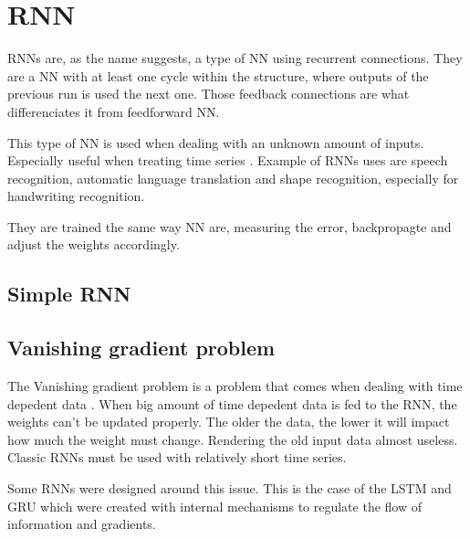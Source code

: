 \section{\acs{RNN}}\label{sec:rnn}

\acp{RNN} are, as the name suggests, a type of \ac{NN} using recurrent connections. They are a \ac{NN} with at least one cycle within the structure, where outputs of the previous run is used the next one. Those feedback connections are what differenciates it from feedforward \ac{NN}.

This type of \ac{NN} is used when dealing with an unknown amount of inputs. Especially useful when treating time series \cite{rnn}. Example of \acp{RNN} uses are speech recognition, automatic language translation \cite{gru} and shape recognition, especially for handwriting recognition.

They are trained the same way \ac{NN} are, measuring the error, backpropagte and adjust the weights accordingly.

\subsection{Simple \ac{RNN}}

\subsection{Vanishing gradient problem}

The Vanishing gradient problem is a problem that comes when dealing with time depedent data \cite{vanishGrad}. When big amount of time depedent data is fed to the \ac{RNN}, the weights can't be updated properly. The older the data, the lower it will impact how much the weight must change. Rendering the old input data almost useless. Classic \acp{RNN} must be used with relatively short time series.

Some \acp{RNN} were designed around this issue. This is the case of the \ac{LSTM} and \ac{GRU} which were created with internal mechanisms to regulate the flow of information and gradients.
